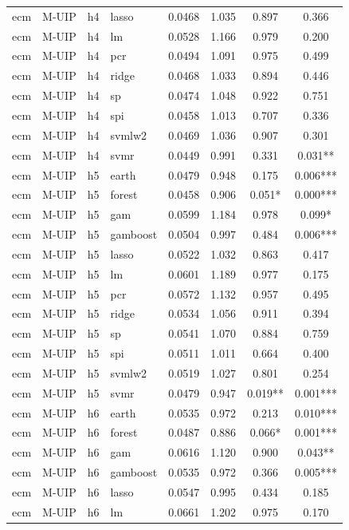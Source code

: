 \begin{ThreePartTable}
\begin{longtable}[t]{llclcccc}
ecm & M-UIP & h4 & lasso & 0.0468 & 1.035 & 0.897 & 0.366\\
ecm & M-UIP & h4 & lm & 0.0528 & 1.166 & 0.979 & 0.200\\
ecm & M-UIP & h4 & pcr & 0.0494 & 1.091 & 0.975 & 0.499\\
ecm & M-UIP & h4 & ridge & 0.0468 & 1.033 & 0.894 & 0.446\\
ecm & M-UIP & h4 & sp & 0.0474 & 1.048 & 0.922 & 0.751\\
ecm & M-UIP & h4 & spi & 0.0458 & 1.013 & 0.707 & 0.336\\
ecm & M-UIP & h4 & svmlw2 & 0.0469 & 1.036 & 0.907 & 0.301\\
ecm & M-UIP & h4 & svmr & 0.0449 & 0.991 & 0.331 & 0.031**\\
\addlinespace
ecm & M-UIP & h5 & earth & 0.0479 & 0.948 & 0.175 & 0.006***\\
ecm & M-UIP & h5 & forest & 0.0458 & 0.906 & 0.051* & 0.000***\\
ecm & M-UIP & h5 & gam & 0.0599 & 1.184 & 0.978 & 0.099*\\
ecm & M-UIP & h5 & gamboost & 0.0504 & 0.997 & 0.484 & 0.006***\\
ecm & M-UIP & h5 & lasso & 0.0522 & 1.032 & 0.863 & 0.417\\
ecm & M-UIP & h5 & lm & 0.0601 & 1.189 & 0.977 & 0.175\\
ecm & M-UIP & h5 & pcr & 0.0572 & 1.132 & 0.957 & 0.495\\
ecm & M-UIP & h5 & ridge & 0.0534 & 1.056 & 0.911 & 0.394\\
ecm & M-UIP & h5 & sp & 0.0541 & 1.070 & 0.884 & 0.759\\
ecm & M-UIP & h5 & spi & 0.0511 & 1.011 & 0.664 & 0.400\\
ecm & M-UIP & h5 & svmlw2 & 0.0519 & 1.027 & 0.801 & 0.254\\
ecm & M-UIP & h5 & svmr & 0.0479 & 0.947 & 0.019** & 0.001***\\
\addlinespace
ecm & M-UIP & h6 & earth & 0.0535 & 0.972 & 0.213 & 0.010***\\
ecm & M-UIP & h6 & forest & 0.0487 & 0.886 & 0.066* & 0.001***\\
ecm & M-UIP & h6 & gam & 0.0616 & 1.120 & 0.900 & 0.043**\\
ecm & M-UIP & h6 & gamboost & 0.0535 & 0.972 & 0.366 & 0.005***\\
ecm & M-UIP & h6 & lasso & 0.0547 & 0.995 & 0.434 & 0.185\\
ecm & M-UIP & h6 & lm & 0.0661 & 1.202 & 0.975 & 0.170\\

\end{longtable}
\end{ThreePartTable}
